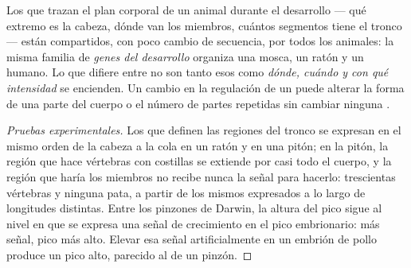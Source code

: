 \begin{proposition}\label{prop:g12:diversification-of-life:development}
Los  que trazan el plan corporal de un animal durante el
desarrollo --- qué extremo es la cabeza, dónde van los miembros,
cuántos segmentos tiene el tronco --- están compartidos, con poco
cambio de secuencia, por todos los animales: la misma familia de
\emph{genes del desarrollo} organiza una
mosca, un ratón y un humano. Lo que difiere entre  no son tanto
esos  como \emph{dónde, cuándo y con qué intensidad} se encienden.
Un cambio en la regulación de un  puede alterar la
forma de una parte del cuerpo o el número de partes repetidas sin
cambiar ninguna .
\end{proposition}
\begin{proof}[Pruebas experimentales]
Los  que definen las regiones del tronco se expresan en el mismo
orden de la cabeza a la cola en un ratón y en una pitón; en la pitón,
la región que hace vértebras con costillas se extiende por casi todo el
cuerpo, y la región que haría los miembros no recibe nunca la señal
para hacerlo: trescientas vértebras y ninguna pata, a partir de los
mismos  expresados a lo largo de longitudes distintas. Entre los
pinzones de Darwin, la altura del pico sigue al nivel en que se expresa
una señal de crecimiento en el pico embrionario: más señal, pico más
alto. Elevar esa señal artificialmente en un embrión de pollo produce
un pico alto, parecido al de un pinzón.
\end{proof}

